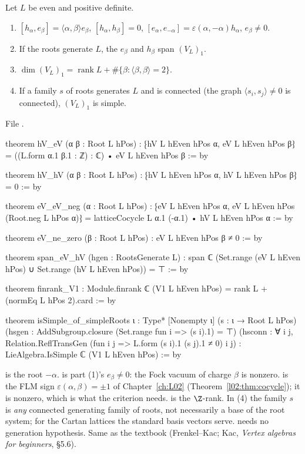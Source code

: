 \begin{theorem}\label{l23:thm:latticesimple}
Let $L$ be even and positive definite.
\begin{enumerate}
\item $[h_\alpha,e_\beta]=\langle\alpha,\beta\rangle e_\beta$, $[h_\alpha,h_\beta]=0$, $[e_\alpha,e_{-\alpha}]=\varepsilon(\alpha,-\alpha)h_\alpha$, $e_\beta\ne0$.
\item If the roots generate $L$, the $e_\beta$ and $h_\beta$ span $(V_L)_1$.
\item $\dim(V_L)_1=\operatorname{rank}L+\#\{\beta:\langle\beta,\beta\rangle=2\}$.
\item If a family $s$ of roots generates $L$ and is connected (the graph $\langle s_i,s_j\rangle\ne0$ is connected), $(V_L)_1$ is simple.
\end{enumerate}
\end{theorem}
\noindent File .
\begin{leancode}
theorem hV_eV (α β : Root L hPos) :
    ⁅hV L hEven hPos α, eV L hEven hPos β⁆ = ((L.form α.1 β.1 : ℤ) : ℂ) • eV L hEven hPos β := by

theorem hV_hV (α β : Root L hPos) : ⁅hV L hEven hPos α, hV L hEven hPos β⁆ = 0 := by

theorem eV_eV_neg (α : Root L hPos) :
    ⁅eV L hEven hPos α, eV L hEven hPos (Root.neg L hPos α)⁆
      = latticeCocycle L α.1 (-α.1) • hV L hEven hPos α := by

theorem eV_ne_zero (β : Root L hPos) : eV L hEven hPos β ≠ 0 := by

theorem span_eV_hV (hgen : RootsGenerate L) :
    span ℂ (Set.range (eV L hEven hPos) ∪ Set.range (hV L hEven hPos)) = ⊤ := by

theorem finrank_V1 : Module.finrank ℂ (V1 L hEven hPos) = rank L + (normEq L hPos 2).card := by

theorem isSimple_of_simpleRoots {ι : Type*} [Nonempty ι] (s : ι → Root L hPos)
    (hsgen : AddSubgroup.closure (Set.range fun i => (s i).1) = ⊤)
    (hsconn : ∀ i j, Relation.ReflTransGen (fun i j => L.form (s i).1 (s j).1 ≠ 0) i j) :
    LieAlgebra.IsSimple ℂ (V1 L hEven hPos) := by
\end{leancode}

\begin{dictionary}
 is the root $-\alpha$.  is part (1)'s $e_\beta\ne0$: the Fock vacuum of charge $\beta$ is
nonzero.  is the FLM sign $\varepsilon(\alpha,\beta)=\pm1$ of Chapter~\ref{ch:L02} (Theorem~\ref{l02:thm:cocycle});
it is nonzero, which is what the criterion needs.  is the $\Z$-rank. In (4) the family $s$ is \emph{any} connected
generating family of roots, not necessarily a base of the root system; for the Cartan lattices the standard basis vectors serve.
 needs no generation hypothesis. Same as the textbook (Frenkel--Kac; Kac, \emph{Vertex algebras for beginners},
\S5.6).
\end{dictionary}

